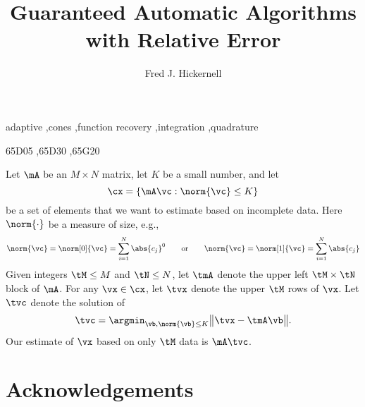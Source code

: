 \documentclass[]{elsarticle}
\theoremstyle{definition}
\theoremstyle{remark}
\begin{document}
\begin{frontmatter}

\title{Guaranteed Automatic Algorithms with Relative Error}
\author{Fred J. Hickernell}
\address{Room E1-208, Department of Applied Mathematics, Illinois Institute of Technology,\\ 10 W.\ 32$^{\text{nd}}$ St., Chicago, IL 60616}
\begin{abstract}
\end{abstract}

\begin{keyword}
adaptive \sep cones \sep function recovery \sep integration \sep quadrature

\MSC[2010] 65D05 \sep 65D30 \sep 65G20

\end{keyword}
\end{frontmatter}


Let $\mA$ be an $M \times N$ matrix, let $K$ be a small number, and let 
\[
\cx = \{ \mA \vc : \norm{\vc} \le K \}
\]
be a set of elements that we want to estimate based on incomplete data.  Here $\norm{\cdot}$ be a measure of size, e.g., 
\[
\norm{\vc} = \norm[0]{\vc} = \sum_{i=1}^N \abs{c_j}^0 \qquad \text{or} \qquad 
\norm{\vc} = \norm[1]{\vc} = \sum_{i=1}^N \abs{c_j}
\]
Given integers $\tM \le M$ and $\tN \le N$, let $\tmA$ denote the upper left $\tM \times \tN$ block of $\mA$. For any $\vx \in \cx$, let $\tvx$ denote the upper $\tM$ rows of $\vx$.  Let $\tvc$ denote the solution of 
\[
\tvc = \argmin_{\vb, \norm{\vb} \le K} \big \lVert \tvx - \tmA \vb \big \rVert.
\] 
Our estimate of $\vx$ based on only $\tM$ data is $\mA \tvc$.


\section*{Acknowledgements} 



\end{document}
